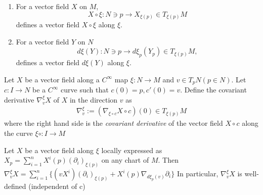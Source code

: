 \begin{definition}
\begin{enumerate}[label=(\arabic*)]
\item For a vector field $X$ on $M$,
\[
X \circ \xi : N \owns p \to X_{\xi(p)} \in T_{\xi(p)}M
\]
defines a vector field $X \circ \xi$ along $\xi$.
\item For a vector field $Y$ on $N$
\[
d \xi(Y) : N \owns p \to d \xi_p(Y_p) \in T_{\xi(p)}M,
\]
defines a vector field $d \xi(Y)$ along $\xi$.
\end{enumerate}
\end{definition}

\begin{definition}
    Let $X$ be a vector field along a $C^{\infty}$ map $\xi:N \to M$
    and $v \in T_p N (p\in N)$. Let $c:I \to N$ be a $C^{\infty}$ curve such that
    $c(0) = p, c'(0) = v$. Define the covariant derivative $\nabla_v^{\xi}X$ of $X$ in the direction $v$ as
    \[
    \begin{aligned}
        \nabla_v^{\xi} := \left(\nabla_{\xi \circ c} X \circ c  \right)(0) \in T_{\xi(p)}M
    \end{aligned}
    \]
    where the right hand side is the \emph{covariant derivative} of the vector field $X \circ c$ along the curve $\xi \circ : I \to M$
\end{definition}

\begin{lemma}
    Let $X$ be a vector field along $\xi$ locally expressed as $X_p = \sum_{i=1}^n X^i(p)(\partial_i)_{\xi(p)}$ on any chart of $M$.
    Then $\nabla_v^{\xi}X = \sum_{i=1}^n\{(v X^i)(\partial_i)_{\xi(p)}+ X^i(p) \nabla_{d \xi_p(v)}\partial_i\}$
    In particular, $\nabla_v^{\xi}X$ is well-defined (independent of c)
    \label{lemma:independence_of_nabla}
\end{lemma}

